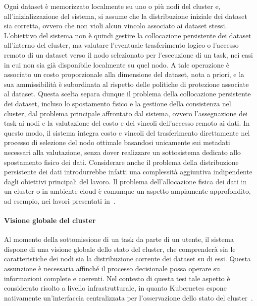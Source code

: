 Ogni dataset è memorizzato localmente su uno o più nodi del cluster e, all'inizializzazione del sistema, si assume che la distribuzione iniziale dei dataset sia corretta, ovvero che non violi alcun vincolo associato ai dataset stessi. L'obiettivo del sistema non è quindi gestire la collocazione persistente dei dataset all'interno del cluster, ma valutare l'eventuale trasferimento logico o l'accesso remoto di un dataset verso il nodo selezionato per l'esecuzione di un task, nei casi in cui non sia già disponibile localmente su quel nodo. A tale operazione è associato un costo proporzionale alla dimensione del dataset, nota a priori, e la sua ammissibilità è subordinata al rispetto delle politiche di protezione associate al dataset. Questa scelta separa dunque il problema della collocazione persistente dei dataset, incluso lo spostamento fisico e la gestione della consistenza nel cluster, dal problema principale affrontato dal sistema, ovvero l'assegnazione dei task ai nodi e la valutazione del costo e dei vincoli dell'accesso remoto ai dati. In questo modo, il sistema integra costo e vincoli del trasferimento direttamente nel processo di selezione del nodo ottimale basandosi unicamente sui metadati necessari alla valutazione, senza dover realizzare un sottosistema dedicato allo spostamento fisico dei dati. Considerare anche il problema della distribuzione persistente dei dati introdurrebbe infatti una complessità aggiuntiva indipendente dagli obiettivi principali del lavoro. Il problema dell'allocazione fisica dei dati in un cluster o in ambiente cloud è comunque un aspetto ampiamente approfondito, ad esempio, nei lavori presentati in~\cite{sec-aware-data-alloc-multicloud, model-decision-data-storage-cloud}.

\paragraph{Visione globale del cluster}
\label{ass:visione_globale}

Al momento della sottomissione di un task da parte di un utente, il sistema dispone di una visione globale dello stato del cluster, che comprenderà sia le caratteristiche dei nodi sia la distribuzione corrente dei dataset su di essi. Questa assunzione è necessaria affinché il processo decisionale possa operare su informazioni complete e coerenti. Nel contesto di questa tesi tale aspetto è considerato risolto a livello infrastrutturale, in quanto Kubernetes espone nativamente un'interfaccia centralizzata per l'osservazione dello stato del cluster~\cite{k8s-comunication-nodes-control-plane, k8s-api}.

